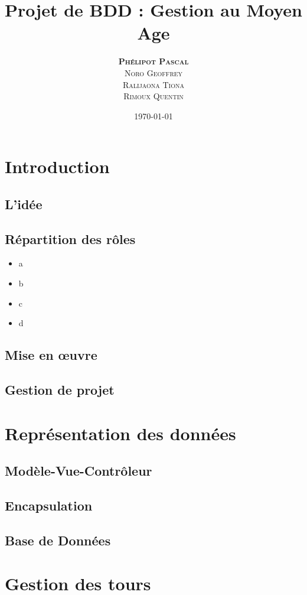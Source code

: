 \documentclass[11pt,a4paper]{article}
\author{\textsc{\textbf{Phélipot Pascal}}\\\textsc{Noro Geoffrey}\\\textsc{Ralijaona Tiona}\\\textsc{Rimoux Quentin}}
\title{Projet de BDD : Gestion au Moyen Age}
\date\today
\begin{document}
\maketitle
\pagestyle{plain}
\newpage{}
\tableofcontents

\newpage{}
\section{Introduction}
\subsection{L'idée}

\subsection{Répartition des rôles}
\begin{itemize}
	\item a 
	\item b
	\item c
	\item d
\end{itemize}
\subsection{Mise en œuvre}
\subsection{Gestion de projet}

\newpage\section{Représentation des données}
\subsection{Modèle-Vue-Contrôleur}
\subsection{Encapsulation}
\subsection{Base de Données}

\newpage\section{Gestion des tours}
\end{document}
